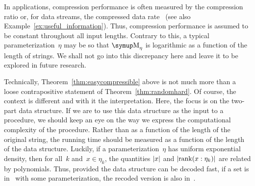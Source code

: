 In applications, compression performance is often measured by the compression ratio or, for data streams, the compressed data rate~\parencite{sayood2017introduction,sneyers2016flif} (see also Example~\ref{ex:useful_information}).
Thus, compression performance is assumed to be constant throughout all input lengths.
Contrary to this, a typical parameterization~$\eta$ may be so that $\upM_\eta$ is logarithmic as a function of the length of strings.
We shall not go into this discrepancy here and leave it to be explored in future research.

Technically, Theorem~\ref{thm:easycompressible} above is not much more than a loose contrapositive statement of Theorem~\ref{thm:randomhard}.
Of course, the context is different and with it the interpretation.
Here, the focus is on the two-part data structure.
If we are to use this data structure as the input to a procedure, we should keep an eye on the way we express the computational complexity of the procedure.
Rather than as a function of the length of the original string, the running time should be measured as a function of the length of the data structure.
Luckily, if a parameterization~$\eta$ has uniform exponential density, then for all~$k$ and~$x \in \eta_k$, the quantities ${\lvert x\rvert}$ and ${\lvert\operatorname{rank}(x : \eta_k)\rvert}$ are related by polynomials.
Thus, provided the data structure can be decoded fast, if a set is in~ with some parameterization, the recoded version is also in~.

